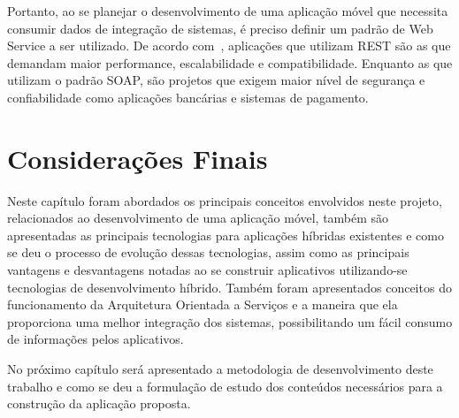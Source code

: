 Portanto, ao se planejar o desenvolvimento de uma aplicação móvel que necessita consumir dados de integração de sistemas, é preciso definir um padrão de Web Service a ser utilizado.
De acordo com~\cite{tihomirovs2016webservices}, aplicações que utilizam REST são as que demandam maior performance, escalabilidade e compatibilidade.
Enquanto as que utilizam o padrão SOAP, são projetos que exigem maior nível de segurança e confiabilidade como aplicações bancárias e sistemas de pagamento.




\section{Considerações Finais}\label{sec:consideracoes-finais}

Neste capítulo foram abordados os principais conceitos envolvidos neste projeto, relacionados ao desenvolvimento de uma aplicação móvel, também são apresentadas as principais tecnologias para aplicações híbridas existentes e como se deu o processo de evolução dessas tecnologias, assim como as principais vantagens e desvantagens notadas ao se construir aplicativos utilizando-se tecnologias de desenvolvimento híbrido.
Também foram apresentados conceitos do funcionamento da Arquitetura Orientada a Serviços e a maneira que ela proporciona uma melhor integração dos sistemas, possibilitando um fácil consumo de informações pelos aplicativos.

No próximo capítulo será apresentado a metodologia de desenvolvimento deste trabalho e como se deu a formulação de estudo dos conteúdos necessários para a construção da aplicação proposta.
